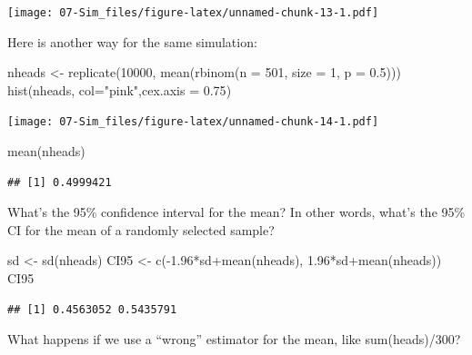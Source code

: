 \documentclass[
]{book}
\newenvironment{Shaded}{\begin{snugshade}}{\end{snugshade}}
\newcommand{\AttributeTok}[1]{\textcolor[rgb]{0.77,0.63,0.00}{#1}}
\newcommand{\DecValTok}[1]{\textcolor[rgb]{0.00,0.00,0.81}{#1}}
\newcommand{\FloatTok}[1]{\textcolor[rgb]{0.00,0.00,0.81}{#1}}
\newcommand{\FunctionTok}[1]{\textcolor[rgb]{0.00,0.00,0.00}{#1}}
\newcommand{\NormalTok}[1]{#1}
\newcommand{\OtherTok}[1]{\textcolor[rgb]{0.56,0.35,0.01}{#1}}
\newcommand{\SpecialCharTok}[1]{\textcolor[rgb]{0.00,0.00,0.00}{#1}}
\newcommand{\StringTok}[1]{\textcolor[rgb]{0.31,0.60,0.02}{#1}}
\begin{document}
\texttt{[image: 07-Sim\_files/figure-latex/unnamed-chunk-13-1.pdf]}

Here is another way for the same simulation:

\begin{Shaded}
\begin{Highlighting}[]
\NormalTok{nheads }\OtherTok{\textless{}{-}} \FunctionTok{replicate}\NormalTok{(}\DecValTok{10000}\NormalTok{, }\FunctionTok{mean}\NormalTok{(}\FunctionTok{rbinom}\NormalTok{(}\AttributeTok{n =} \DecValTok{501}\NormalTok{, }\AttributeTok{size =} \DecValTok{1}\NormalTok{, }\AttributeTok{p =} \FloatTok{0.5}\NormalTok{)))}
\FunctionTok{hist}\NormalTok{(nheads, }\AttributeTok{col=}\StringTok{"pink"}\NormalTok{,}\AttributeTok{cex.axis =} \FloatTok{0.75}\NormalTok{)}
\end{Highlighting}
\end{Shaded}

\texttt{[image: 07-Sim\_files/figure-latex/unnamed-chunk-14-1.pdf]}

\begin{Shaded}
\begin{Highlighting}[]
\FunctionTok{mean}\NormalTok{(nheads)}
\end{Highlighting}
\end{Shaded}

\begin{verbatim}
## [1] 0.4999421
\end{verbatim}

What's the 95\% confidence interval for the mean? In other words, what's the 95\% CI for the mean of a randomly selected sample?

\begin{Shaded}
\begin{Highlighting}[]
\NormalTok{sd }\OtherTok{\textless{}{-}} \FunctionTok{sd}\NormalTok{(nheads)}
\NormalTok{CI95 }\OtherTok{\textless{}{-}} \FunctionTok{c}\NormalTok{(}\SpecialCharTok{{-}}\FloatTok{1.96}\SpecialCharTok{*}\NormalTok{sd}\SpecialCharTok{+}\FunctionTok{mean}\NormalTok{(nheads), }\FloatTok{1.96}\SpecialCharTok{*}\NormalTok{sd}\SpecialCharTok{+}\FunctionTok{mean}\NormalTok{(nheads))}
\NormalTok{CI95}
\end{Highlighting}
\end{Shaded}

\begin{verbatim}
## [1] 0.4563052 0.5435791
\end{verbatim}

What happens if we use a ``wrong'' estimator for the mean, like sum(heads)/300?
\end{document}

